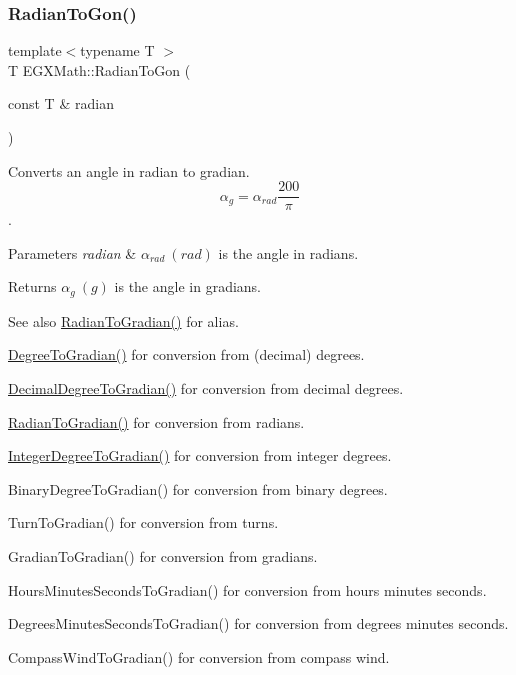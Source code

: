 \subsubsection{\texorpdfstring{Radian\+To\+Gon()}{RadianToGon()}}
{\footnotesize\ttfamily template$<$typename T $>$ \\
T E\+G\+X\+Math\+::\+Radian\+To\+Gon (\begin{DoxyParamCaption}\item[{const T \&}]{radian }\end{DoxyParamCaption})}



Converts an angle in radian to gradian. \[\alpha_{g}=\alpha_{rad}\frac{200}{\pi}\]. 


\begin{DoxyParams}{Parameters}
{\em radian} & $\alpha_{rad}\ (rad)$ is the angle in radians. \\
\hline
\end{DoxyParams}
\begin{DoxyReturn}{Returns}
$\alpha_{g}\ (g)$ is the angle in gradians. 
\end{DoxyReturn}
\begin{DoxySeeAlso}{See also}
\mbox{\hyperlink{group___e_g_x_math-_angle_conversions-_radian_ga3c1607eae50cbf0186c42485bb3878d5}{Radian\+To\+Gradian()}} for alias. 

\mbox{\hyperlink{group___e_g_x_math-_angle_conversions-_degree_ga25bb5506b3f66fff7a1b85bf7bd795b3}{Degree\+To\+Gradian()}} for conversion from (decimal) degrees. 

\mbox{\hyperlink{group___e_g_x_math-_angle_conversions-_decimal_degree_ga3ac6f1ceb36a4938cdf3b55554734c99}{Decimal\+Degree\+To\+Gradian()}} for conversion from decimal degrees. 

\mbox{\hyperlink{group___e_g_x_math-_angle_conversions-_radian_ga3c1607eae50cbf0186c42485bb3878d5}{Radian\+To\+Gradian()}} for conversion from radians. 

\mbox{\hyperlink{group___e_g_x_math-_angle_conversions-_integer_degree_ga47127467ff7a8ef57f6be9ce496a97df}{Integer\+Degree\+To\+Gradian()}} for conversion from integer degrees. 

Binary\+Degree\+To\+Gradian() for conversion from binary degrees. 

Turn\+To\+Gradian() for conversion from turns. 

Gradian\+To\+Gradian() for conversion from gradians. 

Hours\+Minutes\+Seconds\+To\+Gradian() for conversion from hours minutes seconds. 

Degrees\+Minutes\+Seconds\+To\+Gradian() for conversion from degrees minutes seconds. 

Compass\+Wind\+To\+Gradian() for conversion from compass wind. 
\end{DoxySeeAlso}
\mbox{\label{group___e_g_x_math-_angle_conversions-_radian_ga3c1607eae50cbf0186c42485bb3878d5}} 
